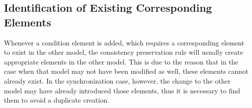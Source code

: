 


\subsection{Identification of Existing Corresponding Elements}
\label{chap:synchronization:achieving:identification}

Whenever a condition element is added, which requires a corresponding element to exist in the other model, the consistency preservation rule will usually create appropriate elements in the other model.
This is due to the reason that in the case when that model may not have been modified as well, these elements cannot already exist.
In the synchronization case, however, the change to the other model may have already introduced those elements, thus it is necessary to find them to avoid a duplicate creation.

